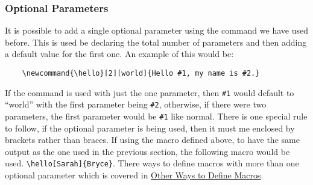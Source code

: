 \subsubsection{Optional Parameters}
It is possible to add a single optional parameter using the command we have used before. This is used be declaring the total number of parameters and then adding a default value for the first one. An example of this would be:
\begin{verbatim}
    \newcommand{\hello}[2][world]{Hello #1, my name is #2.}
\end{verbatim}
If the command is used with just the one parameter, then \verb=#1= would default to ``world'' with the first parameter being \verb=#2=, otherwise, if there were two parameters, the first parameter would be \verb=#1= like normal. There is one special rule to follow, if the optional parameter is being used, then it must me enclosed by brackets rather than braces. If using the macro defined above, to have the same output as the one used in the previous section, the following macro would be used. \verb=\hello[Sarah]{Bryce}=. There ways to define macros with more than one optional parameter which is covered in \hyperref[section:programming/macros/otherWays]{Other Ways to Define Macros}.
